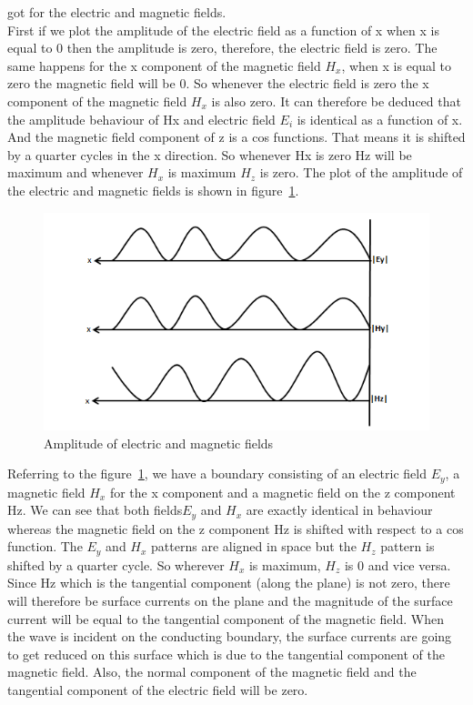got for the electric and magnetic fields.\\ 
First if we plot the amplitude of the electric field as a function of x when x is equal to 0 then the amplitude is zero, therefore, the electric
field is zero. The same happens for the x component of the magnetic field $H_x$, when x is equal to zero the magnetic field will be 0. So whenever the electric field is zero the x component of the magnetic field $H_x$ is also zero. It can therefore be deduced that the amplitude behaviour of Hx and electric field $E_i$ is identical as a function of x. And the magnetic field component of z is a cos
functions. That means it is shifted by a quarter cycles in the x direction. So whenever Hx is zero Hz will be maximum and whenever $H_x$ is maximum $H_z$ is zero. The plot of the amplitude of the electric and magnetic fields is shown in figure~\ref{fig:amplitude}.
\begin{figure}[h]
\centering
\includegraphics[width=1\linewidth]{./graphics/amplitude.png}
\caption{Amplitude of electric and magnetic fields}
\label{fig:amplitude}
\end{figure}
Referring to the figure~\ref{fig:amplitude}, we have a boundary consisting of an electric field $E_y$, a magnetic field $H_x$ for the x component and a magnetic field on the z component Hz. We can see that both fields$ E_y$ and $H_x$ are exactly identical in behaviour whereas the magnetic field on the z component Hz is shifted with respect to a cos function. The $E_y$ and $H_x$ patterns are aligned in space but the $H_z$ pattern is shifted by a quarter cycle. So wherever $H_x$ is maximum, $H_z$ is 0 and vice versa. Since Hz which is the tangential component (along the plane) is not zero, there will therefore be surface currents on the plane and the magnitude of the surface current will be equal to the tangential component of the magnetic field. When the wave is incident on the conducting boundary, the surface currents are going to get reduced on this surface which is due to the tangential component of the magnetic field. Also, the normal component of the magnetic field and the tangential component of the electric field will be zero.\\ 

